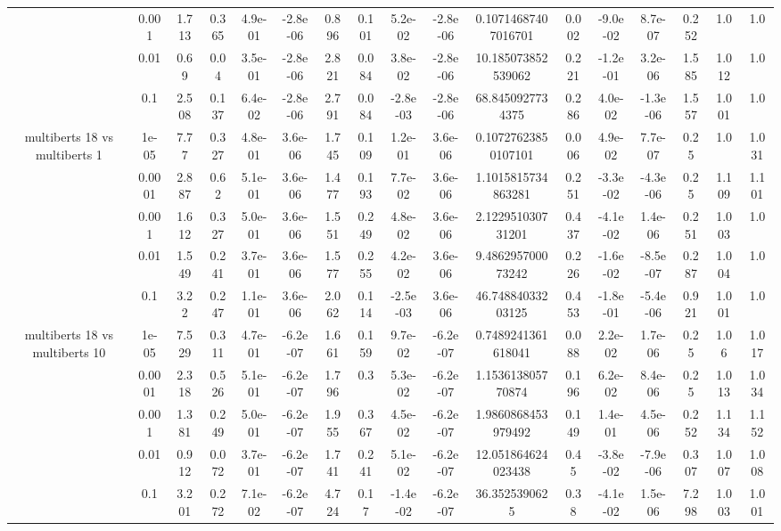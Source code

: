 \begin{tabular}{|c|c|c|c|c|c|c|c|c|c|c|c|c|c|c|c|c|}
 & 0.001 & 1.713 & 0.365 & 4.9e-01 & -2.8e-06 & 0.896 & 0.101 & 5.2e-02 & -2.8e-06 & 0.10714687407016701 & 0.002 & -9.0e-02 & 8.7e-07 & 0.252 & 1.0 & 1.0 \\
 & 0.01 & 0.69 & 0.04 & 3.5e-01 & -2.8e-06 & 2.821 & 0.084 & 3.8e-02 & -2.8e-06 & 10.185073852539062 & 0.221 & -1.2e-01 & 3.2e-06 & 1.585 & 1.012 & 1.0 \\
 & 0.1 & 2.508 & 0.137 & 6.4e-02 & -2.8e-06 & 2.791 & 0.084 & -2.8e-03 & -2.8e-06 & 68.8450927734375 & 0.286 & 4.0e-02 & -1.3e-06 & 1.557 & 1.001 & 1.0 \\
\hline
\multirow{5}{*}{multiberts 18 vs multiberts 1} & 1e-05 & 7.77 & 0.327 & 4.8e-01 & 3.6e-06 & 1.745 & 0.109 & 1.2e-01 & 3.6e-06 & 0.10727623850107101 & 0.006 & 4.9e-02 & 7.7e-07 & 0.25 & 1.0 & 1.031 \\
 & 0.0001 & 2.887 & 0.62 & 5.1e-01 & 3.6e-06 & 1.477 & 0.193 & 7.7e-02 & 3.6e-06 & 1.1015815734863281 & 0.251 & -3.3e-02 & -4.3e-06 & 0.25 & 1.109 & 1.101 \\
 & 0.001 & 1.612 & 0.327 & 5.0e-01 & 3.6e-06 & 1.551 & 0.249 & 4.8e-02 & 3.6e-06 & 2.122951030731201 & 0.437 & -4.1e-02 & 1.4e-06 & 0.251 & 1.003 & 1.0 \\
 & 0.01 & 1.549 & 0.241 & 3.7e-01 & 3.6e-06 & 1.577 & 0.255 & 4.2e-02 & 3.6e-06 & 9.486295700073242 & 0.226 & -1.6e-02 & -8.5e-07 & 0.287 & 1.004 & 1.0 \\
 & 0.1 & 3.22 & 0.247 & 1.1e-01 & 3.6e-06 & 2.062 & 0.114 & -2.5e-03 & 3.6e-06 & 46.74884033203125 & 0.453 & -1.8e-01 & -5.4e-06 & 0.921 & 1.001 & 1.0 \\
\hline
\multirow{5}{*}{multiberts 18 vs multiberts 10} & 1e-05 & 7.529 & 0.311 & 4.7e-01 & -6.2e-07 & 1.661 & 0.159 & 9.7e-02 & -6.2e-07 & 0.7489241361618041 & 0.088 & 2.2e-02 & 1.7e-06 & 0.25 & 1.06 & 1.017 \\
 & 0.0001 & 2.318 & 0.526 & 5.1e-01 & -6.2e-07 & 1.796 & 0.3 & 5.3e-02 & -6.2e-07 & 1.153613805770874 & 0.196 & 6.2e-02 & 8.4e-06 & 0.25 & 1.013 & 1.034 \\
 & 0.001 & 1.381 & 0.249 & 5.0e-01 & -6.2e-07 & 1.955 & 0.367 & 4.5e-02 & -6.2e-07 & 1.9860868453979492 & 0.149 & 1.4e-01 & 4.5e-06 & 0.252 & 1.134 & 1.152 \\
 & 0.01 & 0.912 & 0.072 & 3.7e-01 & -6.2e-07 & 1.741 & 0.241 & 5.1e-02 & -6.2e-07 & 12.051864624023438 & 0.45 & -3.8e-02 & -7.9e-06 & 0.307 & 1.007 & 1.008 \\
 & 0.1 & 3.201 & 0.272 & 7.1e-02 & -6.2e-07 & 4.724 & 0.17 & -1.4e-02 & -6.2e-07 & 36.3525390625 & 0.38 & -4.1e-02 & 1.5e-06 & 7.298 & 1.003 & 1.001 \\

\end{tabular}
